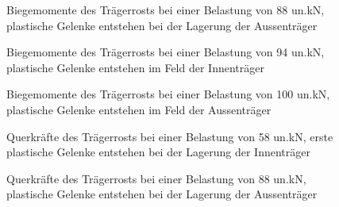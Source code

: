 \documentclass[
  11pt,
  letterpaper,
]{scrreprt}
\begin{document}
\begin{figure}[H]


\caption{\label{fig-trm_my88}Biegemomente des Trägerrosts bei einer
Belastung von 88 un.kN, plastische Gelenke entstehen bei der Lagerung
der Aussenträger}

\end{figure}%

\begin{figure}[H]


\caption{\label{fig-trm_my94}Biegemomente des Trägerrosts bei einer
Belastung von 94 un.kN, plastische Gelenke entstehen im Feld der
Innenträger}

\end{figure}%

\begin{figure}[H]


\caption{\label{fig-trm_my100}Biegemomente des Trägerrosts bei einer
Belastung von 100 un.kN, plastische Gelenke entstehen im Feld der
Aussenträger}

\end{figure}%

\begin{figure}[H]


\caption{\label{fig-trm_vz58}Querkräfte des Trägerrosts bei einer
Belastung von 58 un.kN, erste plastische Gelenke entstehen bei der
Lagerung der Innenträger}

\end{figure}%

\begin{figure}[H]


\caption{\label{fig-trm_vz88}Querkräfte des Trägerrosts bei einer
Belastung von 88 un.kN, plastische Gelenke entstehen bei der Lagerung
der Aussenträger}

\end{figure}%
\end{document}
